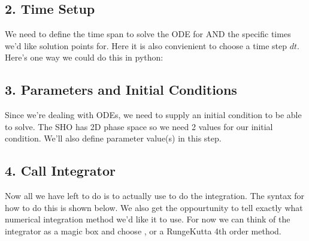 \documentclass[letterpaper,10pt,english]{jupyterBook}
\begin{document}
\subsection{2. Time Setup}
\label{\detokenize{content/1_mechanics/lagrange_2:time-setup}}
\sphinxAtStartPar
We need to define the time span to solve the ODE for AND the specific times we’d like solution points for. Here it is also convienient to choose a time step \(dt\). Here’s one way we could do this in python:

\begin{sphinxVerbatim}[commandchars=\\\{\}]
  
  
           
   
\end{sphinxVerbatim}


\subsection{3. Parameters and Initial Conditions}
\label{\detokenize{content/1_mechanics/lagrange_2:parameters-and-initial-conditions}}
\sphinxAtStartPar
Since we’re dealing with ODEs, we need to supply an initial condition to be able to solve. The SHO has 2D phase space so we need 2 values for our initial condition. We’ll also define parameter value(s) in this step.

\begin{sphinxVerbatim}[commandchars=\\\{\}]
  
  \PYG{p}{[} \PYG{p}{]} 
\end{sphinxVerbatim}


\subsection{4. Call Integrator}
\label{\detokenize{content/1_mechanics/lagrange_2:call-integrator}}
\sphinxAtStartPar
Now all we have left to do is to actually use  to do the integration. The syntax for how to do this is shown below. We also get the oppourtunity to tell  exactly what numerical integration method we’d like it to use. For now we can think of the integrator as a magic box and choose , or a Runge\sphinxhyphen{}Kutta 4th order method.
\end{document}
